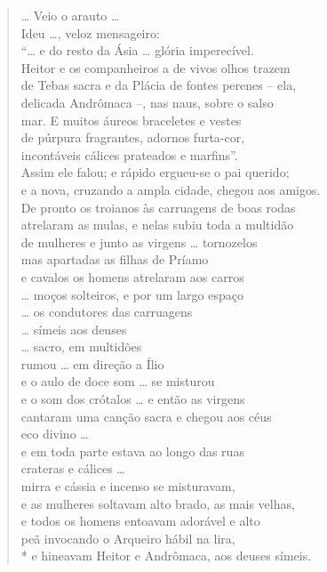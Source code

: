 \begin{verse}
\ldots{} Veio o arauto \ldots{}\\
Ideu \ldots{}, veloz mensageiro:\\
“\ldots{} e do resto da Ásia \ldots{} glória imperecível.\\
Heitor e os companheiros a de vivos olhos trazem\\
de Tebas sacra e da Plácia de fontes perenes -- ela,\\
delicada Andrômaca --, nas naus, sobre o salso\\
mar. E muitos áureos braceletes e vestes\\
de púrpura fragrantes, adornos furta-cor,\\
incontáveis cálices prateados e marfins”.\\
Assim ele falou; e rápido ergueu-se o pai querido;\\
e a nova, cruzando a ampla cidade, chegou aos amigos.\\
De pronto os troianos às carruagens de boas rodas\\
atrelaram as mulas, e nelas subiu toda a multidão \\
de mulheres e junto as virgens \ldots{} tornozelos\\
mas apartadas as filhas de Príamo\\
e cavalos os homens atrelaram aos carros\\
\ldots{} moços solteiros, e por um largo espaço \\
\ldots{} os condutores das carruagens \\
\ldots{} símeis aos deuses\\
\ldots{} sacro, em multidões\\
rumou \ldots{} em direção a Ílio\\
e o aulo de doce som \ldots{} se misturou\\
e o som dos crótalos \ldots{} e então as virgens\\
cantaram uma canção sacra e chegou aos céus\\
eco divino \ldots{}\\
e em toda parte estava ao longo das ruas\\
crateras e cálices \ldots{}\\
mirra e cássia e incenso se misturavam,\\
e as mulheres soltavam alto brado, as mais velhas,\\
e todos os homens entoavam adorável e alto\\
peã invocando o Arqueiro hábil na lira,\\*
e hineavam Heitor e Andrômaca, aos deuses símeis.
\end{verse}

